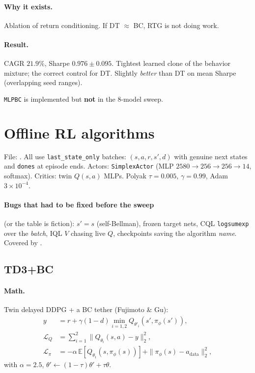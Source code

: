 \documentclass[11pt]{article}
\begin{document}
\paragraph{Why it exists.}
Ablation of return conditioning. If DT $\approx$ BC, RTG is not doing work.

\paragraph{Result.}
CAGR $21.9\%$, Sharpe $0.976\pm 0.095$.
Tightest learned clone of the behavior mixture; the correct control for DT.
Slightly \emph{better} than DT on mean Sharpe (overlapping seed ranges).

\texttt{MLPBC} is implemented but \textbf{not} in the 8-model sweep.

\section{Offline RL algorithms}
\label{sec:offline}

File: .
All use \texttt{last\_state\_only} batches: $(s,a,r,s',d)$ with genuine next
states and \texttt{dones} at episode ends.
Actors: \texttt{SimplexActor} (MLP $2580\to 256\to 256\to 14$, softmax).
Critics: twin $Q(s,a)$ MLPs.
Polyak $\tau=0.005$, $\gamma=0.99$, Adam $3\times 10^{-4}$.

\paragraph{Bugs that had to be fixed before the sweep}
(or the table is fiction): $s'=s$ (self-Bellman), frozen target nets,
CQL \texttt{logsumexp} over the \emph{batch}, IQL $V$ chasing live $Q$,
checkpoints saving the algorithm \emph{name}.
Covered by .

\subsection{TD3+BC}

\paragraph{Math.}
Twin delayed DDPG + a BC tether (Fujimoto \& Gu):
\begin{align}
y &= r+\gamma(1-d)\min_{i=1,2}Q_{\theta'_i}(s',\pi_\phi(s')), \\
\mathcal{L}_Q &= \sum_{i=1}^2\|Q_{\theta_i}(s,a)-y\|_2^2, \\
\mathcal{L}_\pi &= -\alpha\,\mathbb{E}[Q_{\theta_1}(s,\pi_\phi(s))]
+\|\pi_\phi(s)-a_{\mathrm{data}}\|_2^2,
\end{align}
with $\alpha=2.5$, $\theta'\leftarrow(1-\tau)\theta'+\tau\theta$.
\end{document}
